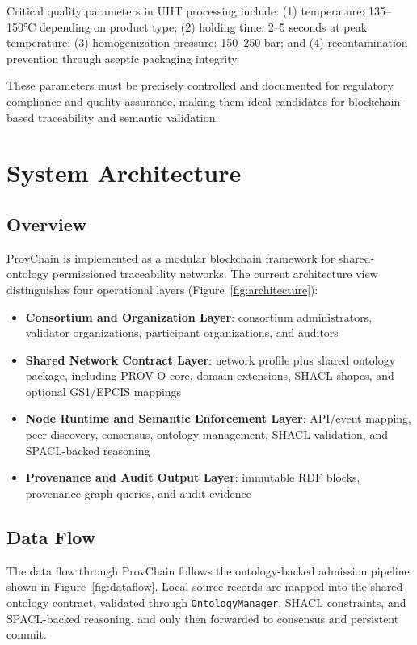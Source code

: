 \documentclass[preprint,review,12pt,authoryear]{elsarticle}
\begin{document}
Critical quality parameters in UHT processing include: (1) temperature: 135--150°C depending on product type; (2) holding time: 2--5 seconds at peak temperature; (3) homogenization pressure: 150--250 bar; and (4) recontamination prevention through aseptic packaging integrity.

These parameters must be precisely controlled and documented for regulatory compliance and quality assurance, making them ideal candidates for blockchain-based traceability and semantic validation.

\section{System Architecture}\label{sec:architecture}

\subsection{Overview}

ProvChain is implemented as a modular blockchain framework for shared-ontology permissioned traceability networks. The current architecture view distinguishes four operational layers (Figure~\ref{fig:architecture}):

\begin{itemize}
    \item \textbf{Consortium and Organization Layer}: consortium administrators, validator organizations, participant organizations, and auditors
    \item \textbf{Shared Network Contract Layer}: network profile plus shared ontology package, including PROV-O core, domain extensions, SHACL shapes, and optional GS1/EPCIS mappings
    \item \textbf{Node Runtime and Semantic Enforcement Layer}: API/event mapping, peer discovery, consensus, ontology management, SHACL validation, and SPACL-backed reasoning
    \item \textbf{Provenance and Audit Output Layer}: immutable RDF blocks, provenance graph queries, and audit evidence
\end{itemize}



\subsection{Data Flow}

The data flow through ProvChain follows the ontology-backed admission pipeline shown in Figure~\ref{fig:dataflow}. Local source records are mapped into the shared ontology contract, validated through \texttt{OntologyManager}, SHACL constraints, and SPACL-backed reasoning, and only then forwarded to consensus and persistent commit.
\end{document}
